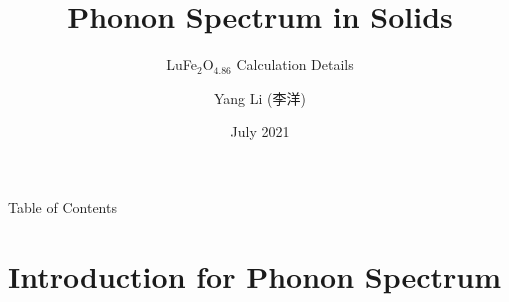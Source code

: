 \documentclass{beamer}
\title[LuFe\(_2\)O\(_{4.86}\)]{Phonon Spectrum in Solids}
\subtitle{LuFe\(_2\)O\(_{4.86}\) Calculation Details}
\author[Yang Li]{Yang Li (李洋)\inst{1}}
\institute[Physics@Tsinghua]{\inst{1}Department of Physics\\Tsinghua University}
\date[Tsinghua Physics 2021]{July 2021}
\begin{document}
\frame{\titlepage}

\begin{frame}{Table of Contents}
\tableofcontents
\end{frame}

\section{Introduction for Phonon Spectrum}
\end{document}
